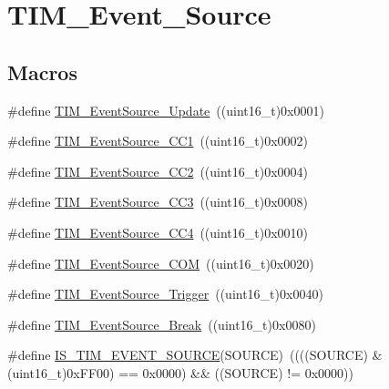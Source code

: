\hypertarget{group___t_i_m___event___source}{}\section{T\+I\+M\+\_\+\+Event\+\_\+\+Source}
\label{group___t_i_m___event___source}
\subsection*{Macros}
\begin{DoxyCompactItemize}
\item 
\#define \mbox{\hyperlink{group___t_i_m___event___source_ga5bff72fbe94b1ae5a710e402c9868b23}{T\+I\+M\+\_\+\+Event\+Source\+\_\+\+Update}}~((uint16\+\_\+t)0x0001)
\item 
\#define \mbox{\hyperlink{group___t_i_m___event___source_gaa634c46d4ac521ad16e25be97b487e8a}{T\+I\+M\+\_\+\+Event\+Source\+\_\+\+C\+C1}}~((uint16\+\_\+t)0x0002)
\item 
\#define \mbox{\hyperlink{group___t_i_m___event___source_ga5e2082a09552acc9c7e9577f104ba15a}{T\+I\+M\+\_\+\+Event\+Source\+\_\+\+C\+C2}}~((uint16\+\_\+t)0x0004)
\item 
\#define \mbox{\hyperlink{group___t_i_m___event___source_gafeb8538e3b00d938e061e5051f83836b}{T\+I\+M\+\_\+\+Event\+Source\+\_\+\+C\+C3}}~((uint16\+\_\+t)0x0008)
\item 
\#define \mbox{\hyperlink{group___t_i_m___event___source_gab60e3190e6c09d2d067f2c689d614979}{T\+I\+M\+\_\+\+Event\+Source\+\_\+\+C\+C4}}~((uint16\+\_\+t)0x0010)
\item 
\#define \mbox{\hyperlink{group___t_i_m___event___source_ga4c06981037fae91786f966aa9b4b3435}{T\+I\+M\+\_\+\+Event\+Source\+\_\+\+C\+OM}}~((uint16\+\_\+t)0x0020)
\item 
\#define \mbox{\hyperlink{group___t_i_m___event___source_ga24835bf5eac25eed90069208dce22564}{T\+I\+M\+\_\+\+Event\+Source\+\_\+\+Trigger}}~((uint16\+\_\+t)0x0040)
\item 
\#define \mbox{\hyperlink{group___t_i_m___event___source_gad6f9b5366d93c73ff005273c50c9f00a}{T\+I\+M\+\_\+\+Event\+Source\+\_\+\+Break}}~((uint16\+\_\+t)0x0080)
\item 
\#define \mbox{\hyperlink{group___t_i_m___event___source_ga4ac88c3e43c8250114ea81a6e052d58a}{I\+S\+\_\+\+T\+I\+M\+\_\+\+E\+V\+E\+N\+T\+\_\+\+S\+O\+U\+R\+CE}}(S\+O\+U\+R\+CE)~((((S\+O\+U\+R\+CE) \& (uint16\+\_\+t)0x\+F\+F00) == 0x0000) \&\& ((\+S\+O\+U\+R\+C\+E) != 0x0000))
\end{DoxyCompactItemize}


